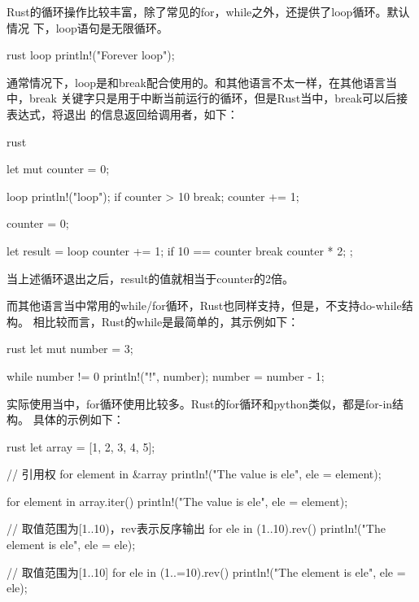 Rust的循环操作比较丰富，除了常见的for，while之外，还提供了loop循环。默认情况
下，loop语句是无限循环。
\begin{code-block}{rust}
loop {
    println!("Forever loop");
}
\end{code-block}
通常情况下，loop是和break配合使用的。和其他语言不太一样，在其他语言当中，break
关键字只是用于中断当前运行的循环，但是Rust当中，break可以后接表达式，将退出
的信息返回给调用者，如下：
\begin{code-block}{rust}

let mut counter = 0;

loop {
    println!("loop");
    if counter > 10 {
        break;
    }
    counter += 1;
}

counter = 0;

let result = loop {
    counter += 1;
    if 10 == counter {
        break counter * 2;
    }
};
\end{code-block}
当上述循环退出之后，result的值就相当于counter的2倍。

而其他语言当中常用的while/for循环，Rust也同样支持，但是，不支持do-while结构。
相比较而言，Rust的while是最简单的，其示例如下：
\begin{code-block}{rust}
let mut number = 3;

while number != 0 {
    println!("{}!", number);
    number = number - 1;
}
\end{code-block}
实际使用当中，for循环使用比较多。Rust的for循环和python类似，都是for-in结构。
具体的示例如下：
\begin{code-block}{rust}
let array = [1, 2, 3, 4, 5];

// 引用权
for element in &array {
    println!("The value is {ele}", ele = element);
}

for element in array.iter() {
    println!("The value is {ele}", ele = element);
}

// 取值范围为[1..10)，rev表示反序输出
for ele in (1..10).rev() {
    println!("The element is {ele}", ele = ele);
}

// 取值范围为[1..10]
for ele in (1..=10).rev() {
    println!("The element is {ele}", ele = ele);
}
\end{code-block}

